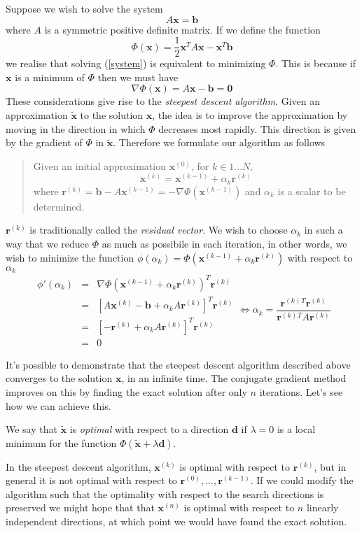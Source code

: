 \documentclass[12pt]{article}
\def\v#1{\mathbf{#1}}
\def\vtilde#1{\mathbf{\tilde{#1}}}
\def\T{^{T}}
\def\grad{\nabla}
\def\con#1{^{(#1)}}
\def\eqn#1#2{\begin{equation} \label{#1} #2 \end{equation}}
\begin{document}
Suppose we wish to solve the system
\eqn{system}{
A\v x = \v b
}
where $A$ is a symmetric positive definite matrix. If we define the function
\eqn{}{\Phi(\v x) = \frac 1 2 \v x\T A \v x - \v x\T \v b}
we realise that solving (\ref{system}) is equivalent to minimizing $\Phi$. This is because if $\v x$ is a minimum of $\Phi$ then we must have
\eqn{}{\grad \Phi(\v x) = A\v x - \v b = \v 0}
These considerations give rise to the \emph{steepest descent algorithm}. Given an approximation $\vtilde x$ to the solution $\v x$, the idea is to improve the approximation by moving in the direction in which $\Phi$ decreases most rapidly. This direction is given by the gradient of $\Phi$ in $\vtilde x$. Therefore we formulate our algorithm as follows
\begin{quote}
Given an initial approximation $\v x\con 0$, for $k \in 1...N$,
$$\v x\con{k} = \v x\con{k-1} + \alpha_k \v r\con k$$
where $\v r\con k = \v b - A\v x \con{k-1} = -\grad \Phi(\v x \con{k-1})$ and $\alpha_k$ is a scalar to be determined.
\end{quote}
$\v r\con k$ is traditionally called the \emph{residual vector}. We wish to choose $\alpha_k$ in such a way that we reduce $\Phi$ as much as possibile in each iteration, in other words, we wish to minimize the function $\phi(\alpha_k) = \Phi(\v x\con{k-1} + \alpha_k \v r \con k)$ with respect to $\alpha_k$
$$
\begin{array}{rcl}
\phi'(\alpha_k) &=& \grad \Phi(\v x\con{k-1} + \alpha_k \v r \con k)\T \v r\con{k} \\
&=& [A\v x\con k - \v b + \alpha_k A\v r\con k]\T\v r \con k \\
&=& [-\v r\con k + \alpha_k A\v r \con k]\T \v r \con k \\
&=& 0
\end{array}
\Longleftrightarrow \alpha_k = \frac{\v r\con k{}\T\v r \con k}{\v r \con k{}\T A \v r \con k}
$$

It's possible to demonstrate that the steepest descent algorithm described above converges to the solution $\v x$, in an infinite time. The conjugate gradient method improves on this by finding the exact solution after only $n$ iterations. Let's see how we can achieve this.

We say that $\vtilde x$ is \emph{optimal} with respect to a direction $\v d$ if $\lambda = 0$ is a local minimum for the function $\Phi(\vtilde x + \lambda \v d)$.

In the steepest descent algorithm, $\v x\con k$ is optimal with respect to $\v r\con k$, but in general it is not optimal with respect to $\v r\con 0,...,\v r\con{k-1}$. If we could modify the algorithm such that the optimality with respect to the search directions is preserved we might hope that that $\v x\con n$ is optimal with respect to $n$ linearly independent directions, at which point we would have found the exact solution.
\end{document}
